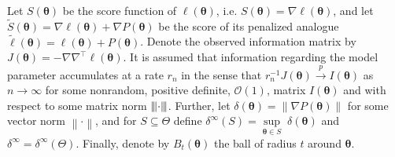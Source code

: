 \documentclass[11pt, a4paper]{article}
\newcommand*{\bb}{\boldsymbol}
\newcommand{\vnorm}[1]{\ensuremath{{\left\| #1 \right\|}}}
\newcommand{\mnorm}[1]{{\left\vert\kern-0.25ex\left\vert\kern-0.25ex\left\vert #1 
		\right\vert\kern-0.25ex\right\vert\kern-0.25ex\right\vert}}
\theoremstyle{example} \newtheorem{example}{Example}[section]
\theoremstyle{theorem} \newtheorem{theorem}{Theorem}[section]
\def\btheta{\bb{\theta}}
\begin{document}
Let $S(\btheta) $ be the score function of $\ell(\btheta)$, i.e. $S(\btheta ) =\nabla \ell(\btheta)$, and let $\tilde{S}(\btheta) = \nabla\ell(\btheta) + \nabla P(\btheta)$ be the score of its penalized analogue $\tilde{\ell}(\btheta) = \ell(\btheta)+P(\btheta)$. Denote the observed information matrix by $J(\btheta) = -\nabla \nabla^\top \ell(\btheta)$. It is assumed that information regarding the model parameter accumulates at a rate $r_n$ in the sense that $r_n^{-1}J(\btheta ) \overset{p}{\to} I(\btheta)$ as $n \to \infty$ for some nonrandom, positive definite, $\mathcal{O}(1)$, matrix $I(\btheta)$ and with respect to some matrix norm $\mnorm{\cdot}$. Further, let $\delta(\btheta) = \vnorm{\nabla P(\btheta)}$ %
for some vector norm $\vnorm{\cdot}$, and for $S \subseteq \Theta$ define $\delta^\infty(S)  = \underset{\btheta \in S}{\sup} \; \delta(\btheta)$ and $\delta^\infty = \delta^\infty(\Theta)$. Finally, denote by $B_t(\btheta)$ the ball of radius $t$ around $\btheta$. 
\end{document}

